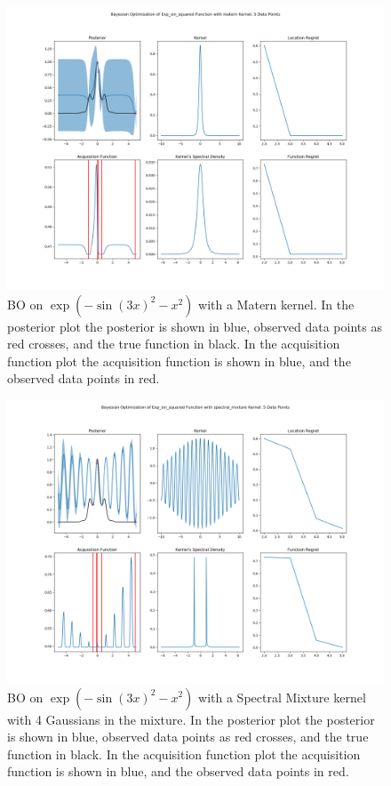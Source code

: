 \documentclass[a4paper]{article}
\begin{document}
\begin{figure}
\centering
\includegraphics[width=\textwidth]{exp_sin_sq_matern_board05}
\caption{BO on $\exp(-\sin(3x)^2 - x^2)$ with a Matern kernel.
In the posterior plot the posterior is shown in blue, observed data points as red crosses, and the true function in black.
In the acquisition function plot the acquisition function is shown in blue, and the observed data points in red.}
\label{ess_matern}
\end{figure}
\begin{figure}
\centering
\includegraphics[width=\textwidth]{exp_sin_sq_sm_board05}
\caption{BO on $\exp(-\sin(3x)^2 - x^2)$ with a Spectral Mixture kernel with 4 Gaussians in the mixture.
In the posterior plot the posterior is shown in blue, observed data points as red crosses, and the true function in black.
In the acquisition function plot the acquisition function is shown in blue, and the observed data points in red.}
\label{ess_sm}
\end{figure}
\end{document}
